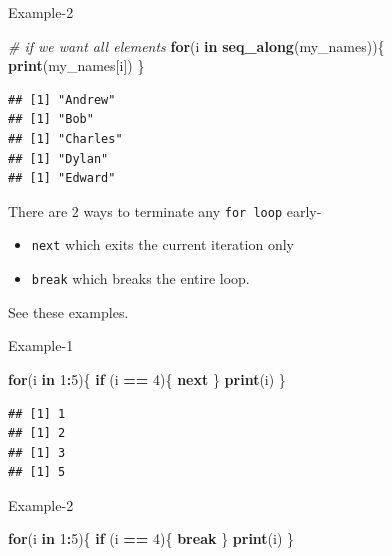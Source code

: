 \documentclass[
]{book}
\newenvironment{Shaded}{\begin{snugshade}}{\end{snugshade}}
\newcommand{\CommentTok}[1]{\textcolor[rgb]{0.56,0.35,0.01}{\textit{#1}}}
\newcommand{\ControlFlowTok}[1]{\textcolor[rgb]{0.13,0.29,0.53}{\textbf{#1}}}
\newcommand{\DecValTok}[1]{\textcolor[rgb]{0.00,0.00,0.81}{#1}}
\newcommand{\FunctionTok}[1]{\textcolor[rgb]{0.13,0.29,0.53}{\textbf{#1}}}
\newcommand{\NormalTok}[1]{#1}
\newcommand{\SpecialCharTok}[1]{\textcolor[rgb]{0.81,0.36,0.00}{\textbf{#1}}}
\providecommand{\tightlist}{%
  \setlength{\itemsep}{0pt}\setlength{\parskip}{0pt}}
\begin{document}
Example-2

\begin{Shaded}
\begin{Highlighting}[]
\CommentTok{\# if we want all elements}
\ControlFlowTok{for}\NormalTok{(i }\ControlFlowTok{in} \FunctionTok{seq\_along}\NormalTok{(my\_names))\{}
  \FunctionTok{print}\NormalTok{(my\_names[i])}
\NormalTok{\}}
\end{Highlighting}
\end{Shaded}

\begin{verbatim}
## [1] "Andrew"
## [1] "Bob"
## [1] "Charles"
## [1] "Dylan"
## [1] "Edward"
\end{verbatim}

There are 2 ways to terminate any \texttt{for\ loop} early-

\begin{itemize}
\tightlist
\item
  \texttt{next} which exits the current iteration only
\item
  \texttt{break} which breaks the entire loop.
\end{itemize}

See these examples.

Example-1

\begin{Shaded}
\begin{Highlighting}[]
\ControlFlowTok{for}\NormalTok{(i }\ControlFlowTok{in} \DecValTok{1}\SpecialCharTok{:}\DecValTok{5}\NormalTok{)\{}
  \ControlFlowTok{if}\NormalTok{ (i }\SpecialCharTok{==} \DecValTok{4}\NormalTok{)\{}
    \ControlFlowTok{next}
\NormalTok{  \}}
  \FunctionTok{print}\NormalTok{(i)}
\NormalTok{\}}
\end{Highlighting}
\end{Shaded}

\begin{verbatim}
## [1] 1
## [1] 2
## [1] 3
## [1] 5
\end{verbatim}

Example-2

\begin{Shaded}
\begin{Highlighting}[]
\ControlFlowTok{for}\NormalTok{(i }\ControlFlowTok{in} \DecValTok{1}\SpecialCharTok{:}\DecValTok{5}\NormalTok{)\{}
  \ControlFlowTok{if}\NormalTok{ (i }\SpecialCharTok{==} \DecValTok{4}\NormalTok{)\{}
    \ControlFlowTok{break}
\NormalTok{  \}}
  \FunctionTok{print}\NormalTok{(i)}
\NormalTok{\}}
\end{Highlighting}
\end{Shaded}
\end{document}
